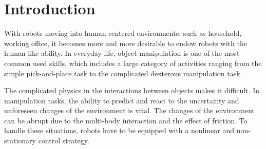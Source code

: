 \section{Introduction}
\label{intro}
With robots moving into human-centered environments, such as household, working office, it becomes more and more desirable to endow robots with the human-like ability. In everyday life, object manipulation is one of the most common used skills, which includes a large category of activities ranging from the simple pick-and-place task to the complicated dexterous manipulation task. 


The complicated physics in the interactions between objects makes it difficult.
In manipulation tasks, the ability to predict and react to the uncertainty and unforeseen changes of the environment is vital. The changes of the environment can be abrupt due to the multi-body interaction and the effect of friction. To handle these situations, robots have to be equipped with a nonlinear and non-stationary control strategy.





